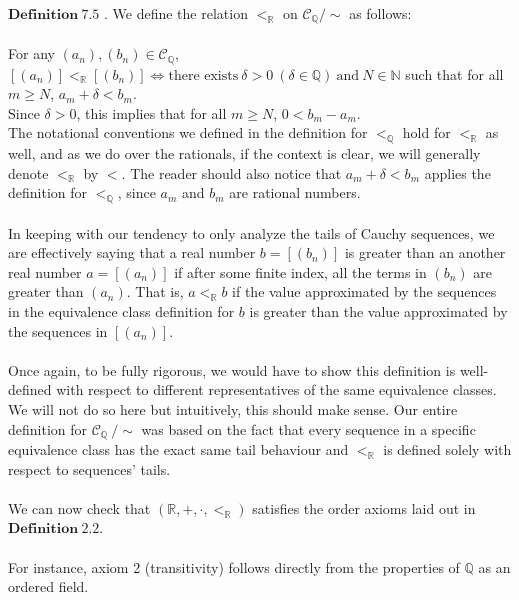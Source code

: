 \documentclass[12pt]{article}
\theoremstyle{definition}
\theoremstyle{remark}
\begin{document}
\noindent $\mathbf{Definition\ 7.5}$ \cite[pg.20]{approaches}.
        We define the relation $<_\mathbb{R}$ on $\mathscr{C}_\mathbb{Q}/\sim$ as follows:\\\\
        For any $(a_n), (b_n)\in\mathscr{C}_\mathbb{Q}$, $[(a_n)]<_\mathbb{R}[(b_n)]\iff \text{there exists}\ \delta>0\ (\delta\in\mathbb{Q})\ \text{and}\ N\in\mathbb{N}$ such that for all $m \geq N$, $a_{m}+\delta < b_{m}$.\\
        
        \noindent Since $\delta>0$, this implies that for all $m\geq N$, $0<b_m-a_m$.\\

\noindent The notational conventions we defined in the definition for $<_\mathbb{Q}$ hold for $<_\mathbb{R}$ as well, and as we do over the rationals, if the context is clear, we will generally denote $<_\mathbb{R}$ by $<$. The reader should also notice that $a_{m}+\delta <b_{m}$ applies the definition for $<_\mathbb{Q}$, since $a_{m}$ and $b_{m}$ are rational numbers.\\\\
\noindent In keeping with our tendency to only analyze the tails of Cauchy sequences, we are effectively saying that a real number $b=[(b_n)]$ is greater than an another real number $a=[(a_n)]$ if after some finite index, all the terms in $(b_n)$ are greater than $(a_n)$. That is, $a<_\mathbb{R} b$ if the value approximated by the sequences in the equivalence class definition for $b$ is greater than the value approximated by the sequences in $[(a_n)]$.\\\\
\noindent Once again, to be fully rigorous, we would have to show this definition is well-defined with respect to different representatives of the same equivalence classes. We will not do so here but intuitively, this should make sense. Our entire definition for $\mathscr{C}_\mathbb{Q}\ /\sim$ was based on the fact that every sequence in a specific equivalence class has the exact same tail behaviour and $<_\mathbb{R}$ is defined solely with respect to sequences' tails.\\\\
We can now check that $(\mathbb{R},+,\cdot,<_\mathbb{R})$ satisfies the order axioms laid out in $\mathbf{Definition\ 2.2}$.\\\\
\noindent For instance, axiom 2 (transitivity) follows directly from the properties of $\mathbb{Q}$ as an ordered field.
\end{document}
